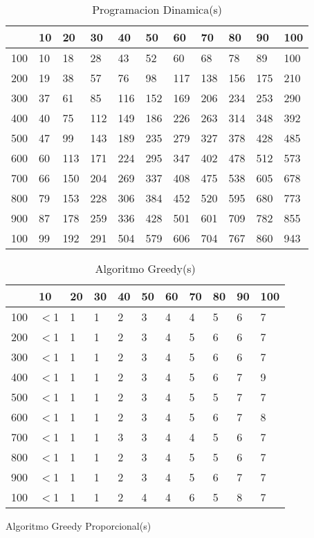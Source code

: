 \documentclass{article}
\begin{document}
\begin{center}
\begin{table}
\centering
\caption{Programacion Dinamica(\textmu s)}
\begin{tabularx}{0.8\textwidth}{|X|X|X|X|X|X|X|X|X|X|X|}
\hline &10&20&30&40&50&60&70&80&90&100\\
\hline 100&10&18&28&43&52&60&68&78&89&100\\
\hline 200&19&38&57&76&98&117&138&156&175&210\\
\hline 300&37&61&85&116&152&169&206&234&253&290\\
\hline 400&40&75&112&149&186&226&263&314&348&392\\
\hline 500&47&99&143&189&235&279&327&378&428&485\\
\hline 600&60&113&171&224&295&347&402&478&512&573\\
\hline 700&66&150&204&269&337&408&475&538&605&678\\
\hline 800&79&153&228&306&384&452&520&595&680&773\\
\hline 900&87&178&259&336&428&501&601&709&782&855\\
\hline 100&99&192&291&504&579&606&704&767&860&943\\
\hline
\end{tabularx}
\end{table}
\begin{table}
\centering
\caption{Algoritmo Greedy(\textmu s)}
\begin{tabularx}{0.8\textwidth}{|X|X|X|X|X|X|X|X|X|X|X|}
\hline &10&20&30&40&50&60&70&80&90&100\\
\hline 100&$<$1&1&1&2&3&4&4&5&6&7\\
\hline 200&$<$1&1&1&2&3&4&5&6&6&7\\
\hline 300&$<$1&1&1&2&3&4&5&6&6&7\\
\hline 400&$<$1&1&1&2&3&4&5&6&7&9\\
\hline 500&$<$1&1&1&2&3&4&5&5&7&7\\
\hline 600&$<$1&1&1&2&3&4&5&6&7&8\\
\hline 700&$<$1&1&1&3&3&4&4&5&6&7\\
\hline 800&$<$1&1&1&2&3&4&5&5&6&7\\
\hline 900&$<$1&1&1&2&3&4&5&6&7&7\\
\hline 100&$<$1&1&1&2&4&4&6&5&8&7\\
\hline
\end{tabularx}
\end{table}
\begin{table}
\centering
\caption{Algoritmo Greedy Proporcional(\textmu s)}

\end{table}
\end{center}
\end{document}
